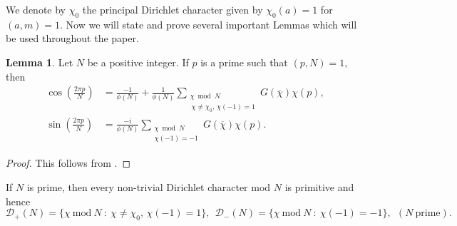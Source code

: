 \documentclass{amsart}
\theoremstyle{definition}
\newtheorem {lemma}[theorem]{Lemma}
\numberwithin{equation}{section}
\begin{document}
We denote by $\chi_0$ the principal Dirichlet character given by $\chi_0(a)=1$ for $(a,m)=1$. 
Now we will state and prove several important Lemmas which will be used throughout the paper.

\begin{lemma} \label{lem.cosi}
Let $N$ be a positive integer.
If $p$ is a prime such that $(p,N)=1$, then 
\begin{align}
\cos \left(\frac{2 \pi p}N \right) &= \frac{-1}{\phi(N)}   + \frac{1}{\phi(N)} \sum_{\substack{\chi \bmod N \\ \ \chi \neq \chi_0, \, \chi(-1) = 1}} G(\overline{\chi}) \chi(p), \label{eq.cos-1}\\
\sin\left(\frac{2 \pi p}{N} \right) &= \frac{-i}{\phi(N)} \sum_{\substack{\chi \bmod N \\ \chi(-1) = -1}} G(\overline{\chi}) \chi(p).\label{eq.sin-1}
\end{align}
\end{lemma}

\begin{proof}
This follows from \cite[(3.11)]{IK}.
\end{proof}

If $N$ is prime, then every non-trivial Dirichlet character mod $N$ is primitive  and hence
\begin{equation}\label{eq.Dpm}
\mathcal{D}_{+}(N) = \{\chi~\mathrm{mod}~N~:~\chi\neq\chi_0,\, \chi(-1) = 1 \},
\ \ 
\mathcal{D}_{-}(N) = \{\chi~\mathrm{mod}~N~:~ \chi(-1)=-1 \}, \ \ (N~\text{prime}).
\end{equation}
\end{document}
